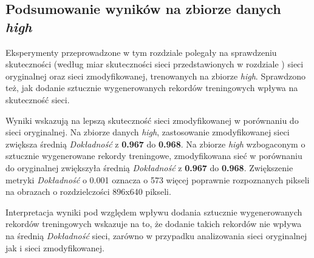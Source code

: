 \subsection{Podsumowanie wyników na zbiorze danych \textit{high}}
Eksperymenty przeprowadzone w tym rozdziale polegały na sprawdzeniu skuteczności (według miar skuteczności sieci przedstawionych w rozdziale ) sieci oryginalnej oraz sieci zmodyfikowanej, trenowanych na zbiorze \textit{high}.
Sprawdzono też, jak dodanie sztucznie wygenerowanych rekordów treningowych wpływa na skuteczność sieci.


Wyniki wskazują na lepszą skuteczność sieci zmodyfikowanej w porównaniu do sieci oryginalnej.
Na zbiorze danych \textit{high}, zastosowanie zmodyfikowanej sieci zwiększa średnią \textit{Dokładność} z \textbf{0.967} do \textbf{0.968}.
Na zbiorze \textit{high} wzbogaconym o sztucznie wygenerowane rekordy treningowe, zmodyfikowana sieć w porównaniu do oryginalnej zwiększyła średnią \textit{Dokładność} z \textbf{0.967} do \textbf{0.968}.
Zwiększenie metryki \textit{Dokładność} o 0.001 oznacza o 573 więcej poprawnie rozpoznanych pikseli na obrazach o rozdzielczości 896x640 pikseli.


Interpretacja wyniki pod względem wpływu dodania sztucznie wygenerowanych rekordów treningowych wskazuje na to, że dodanie takich rekordów nie wpływa na średnią \textit{Dokładność} sieci, zarówno w przypadku analizowania sieci oryginalnej jak i sieci zmodyfikowanej.
